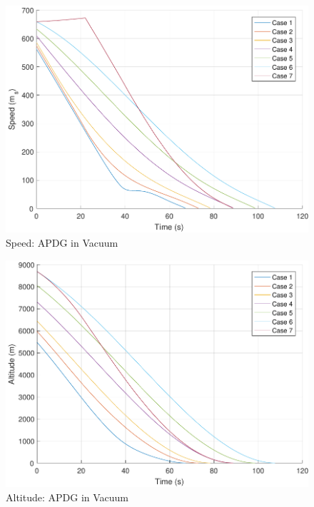 \begin{figure}[H]
	\centering
	\begin{minipage}{4.3 in}
		\includegraphics[width=\linewidth]{Figures/spdpowvac.pdf}
		\caption{Speed: APDG in Vacuum \label{fig:spdpowvac} }
	\end{minipage}
\end{figure}

\begin{figure}[H]
	\centering
	\begin{minipage}{4.3 in}
		\includegraphics[width=\linewidth]{Figures/altpowvac.pdf}
		\caption{Altitude: APDG in Vacuum \label{fig:altpowvac} }
	\end{minipage}
\end{figure}

